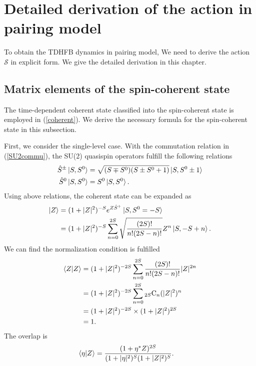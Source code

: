 \documentclass[11pt]{book} %
\begin{document}
\clearpage{\pagestyle{empty}\cleardoublepage}
\appendix

\chapter{Detailed derivation of the action in pairing model}
\label{derivation}
To obtain the TDHFB dynamics in pairing model, We need to derive the action $\mathcal{S}$ in explicit form. We give the detailed derivation in this chapter.

\section{Matrix elements of the spin-coherent state}
\label{formula1}
The time-dependent coherent state classified into the spin-coherent state is employed in (\ref{coherent}). We derive the necessary formula for the spin-coherent state in this subsection. \par
First, we consider the single-level case.
With the commutation relation in (\ref{SU2commu}), the SU(2) quasispin operators fulfill the following relations
\begin{align}
  \hat{S}^{\pm}\ket{S,S^0} &= \sqrt{(S\mp S^0)(S\pm S^0+1)} \ket{S,S^0\pm 1}
  \label{S_pm} \\
  \hat{S}^0\ket{S,S^0} &= S^0\ket{S,S^0} .
\end{align}
Using above relations, the coherent state can be expanded as 
\begin{align}
  \ket{Z} &= (1+|Z|^2)^{-S}e^{Z \hat{S}^+}\ket{S,S^0=-S} \nonumber \\
  &= (1+|Z|^2)^{-S}\sum_{n=0}^{2S}\sqrt{\frac{(2S)!}{n!(2S-n)!}}Z^n\ket{S,-S+n} .
\end{align}
We can find the normalization condition is fulfilled
\begin{align}
  \braket{Z|Z} &= (1+|Z|^2)^{-2S}\sum_{n=0}^{2S}\frac{(2S)!}{n!(2S-n)!}|Z|^{2n} \nonumber \\
  &= (1+|Z|^2)^{-2S}\sum_{n=0}^{2S} {}_{2S}\mathrm{C}_n(|Z|^2)^n \nonumber \\
  &= (1+|Z|^2)^{-2S}\times(1+|Z|^2)^{2S} \nonumber \\
  &= 1 .
\end{align}
The overlap is
\begin{align}
  \braket{\eta|Z} &= \frac{(1+\eta^*Z)^{2S}}{(1+|\eta|^2)^S(1+|Z|^2)^S} .
\end{align}
\end{document}
